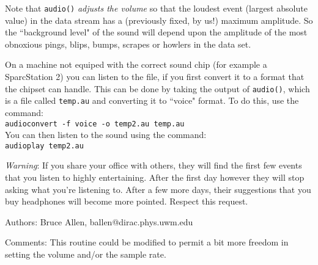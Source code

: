 Note that {\tt audio()} {\it adjusts the volume} so that the loudest
event (largest absolute value) in the data stream has a (previously
fixed, by us!) maximum amplitude.  So the ``background level" of the
sound will depend upon the amplitude of the most obnoxious pings, blips,
bumps, scrapes or howlers in the data set.

On a machine not equiped with the correct sound chip (for example
a SparcStation 2) you can listen to the file, if you first convert it
to a format that the chipset can handle.  This can be done by taking
the output of {\tt audio()}, which is a file called
{\tt temp.au} and converting it to ``voice" format.
To do this, use the command:\\
{\tt audioconvert -f voice -o temp2.au temp.au}\\
You can then listen to the sound using the command:\\
{\tt audioplay temp2.au}

{\it Warning}:  If you share your office with others, they will find
the first few events that you listen to highly entertaining.  After the
first day however they will stop asking what you're listening to.
After a few more days, their suggestions that you buy headphones will
become more pointed.  Respect this request.
\begin{description}
\item{Authors:}
Bruce Allen, ballen@dirac.phys.uwm.edu
\item{Comments:}
This routine could be modified to permit a bit more freedom in
setting the volume and/or the sample rate.
\end{description}
\clearpage


